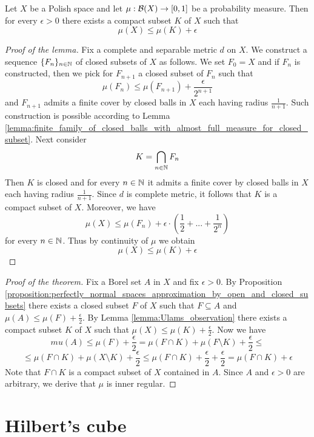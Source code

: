\begin{lemma}\label{lemma:Ulams_observation}
Let $X$ be a Polish space and let $\mu:{\mathcal B}(X)\rightarrow [0,1]$ be a probability measure. Then for every $\epsilon > 0$ there exists a compact subset $K$ of $X$ such that
$$\mu(X)\leq \mu(K) + \epsilon$$
\end{lemma}
\begin{proof}[Proof of the lemma]
Fix a complete and separable metric $d$ on $X$. We construct a sequence $\{F_n\}_{n\in {\mathbb N}}$ of closed subsets of $X$ as follows. We set $F_0 = X$ and if $F_n$ is constructed, then we pick for $F_{n+1}$ a closed subset of $F_n$ such that
$$\mu(F_{n})\leq \mu(F_{n+1}) + \frac{\epsilon}{2^{n+1}}$$
and $F_{n+1}$ admits a finite cover by closed balls in $X$ each having radius $\frac{1}{n+1}$. Such construction is possible according to Lemma \ref{lemma:finite_family_of_closed_balls_with_almost_full_measure_for_closed_subset}. Next consider 
$$K = \bigcap_{n\in {\mathbb N}}F_n$$
Then $K$ is closed and for every $n\in {\mathbb N}$ it admits a finite cover by closed balls in $X$ each having radius $\frac{1}{n+1}$. Since $d$ is complete metric, it follows that $K$ is a compact subset of $X$. Moreover, we have
$$\mu(X) \leq \mu(F_n) + \epsilon\cdot \left(\frac{1}{2} + ... + \frac{1}{2^{n}}\right)$$
for every $n\in {\mathbb N}$. Thus by continuity of $\mu$ we obtain
$$\mu(X) \leq \mu(K) + \epsilon$$
\end{proof}

\begin{proof}[Proof of the theorem]
Fix a Borel set $A$ in $X$ and fix $\epsilon > 0$. By Proposition \ref{proposition:perfectly_normal_spaces_approximation_by_open_and_closed_subsets} there exists a closed subset $F$ of $X$ such that $F\subseteq A$ and $\mu(A) \leq \mu(F) + \frac{\epsilon}{2}$. By Lemma \ref{lemma:Ulams_observation} there exists a compact subset $K$ of $X$ such that $\mu(X) \leq \mu(K) + \frac{\epsilon}{2}$. Now we have
$$mu\left(A\right) \leq \mu(F) + \frac{\epsilon}{2} = \mu(F\cap K) + \mu(F\setminus K) + \frac{\epsilon}{2} \leq$$
$$\leq \mu(F\cap K) + \mu(X\setminus K) + \frac{\epsilon}{2}  \leq \mu(F\cap K) + \frac{\epsilon}{2} +  \frac{\epsilon}{2} = \mu(F\cap K) + \epsilon$$
Note that $F\cap K$ is a compact subset of $X$ contained in $A$. Since $A$ and $\epsilon > 0$ are arbitrary, we derive that $\mu$ is inner regular.
\end{proof}

\section{Hilbert's cube}

